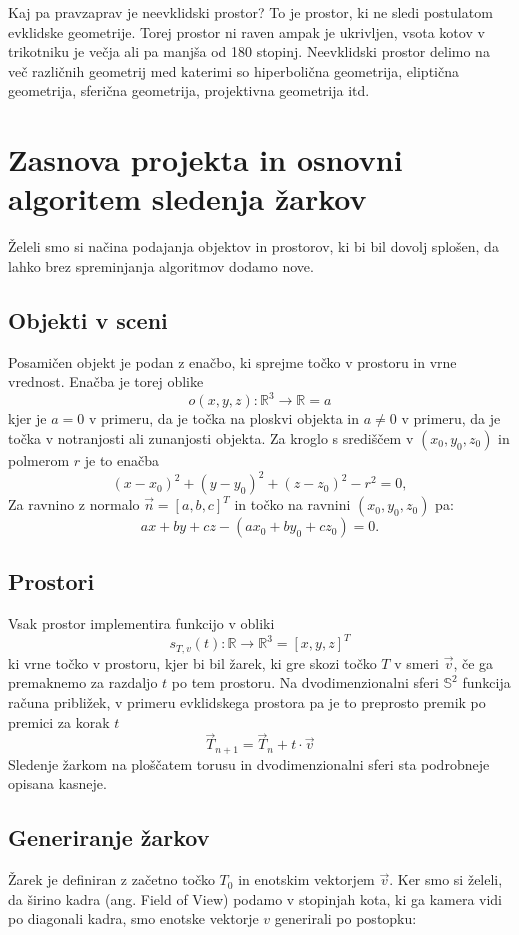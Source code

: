 \documentclass[titlepage]{article}
\begin{document}
Kaj pa pravzaprav je neevklidski prostor? To je prostor, ki ne sledi postulatom evklidske geometrije. 
Torej prostor ni raven ampak je ukrivljen, vsota kotov v trikotniku je večja ali pa manjša od 
180 stopinj. Neevklidski prostor delimo na več različnih geometrij med katerimi so 
hiperbolična geometrija, eliptična geometrija, sferična geometrija, projektivna geometrija itd.

\section{Zasnova projekta in osnovni algoritem sledenja žarkov}
Želeli smo si načina podajanja objektov in prostorov, ki bi bil dovolj splošen, da lahko brez
spreminjanja algoritmov dodamo nove.

\subsection{Objekti v sceni}
Posamičen objekt je podan z enačbo, ki sprejme točko v prostoru in vrne vrednost. 
Enačba je torej oblike
\[ o(x,y,z): \mathbb{R}^3 \to \mathbb{R} = a \]
kjer je \(a = 0\) v primeru, da je točka na ploskvi objekta in \( a \neq 0 \) v primeru, da 
je točka v notranjosti ali zunanjosti objekta.
Za kroglo s središčem v $(x_{0}, y_{0}, z_{0})$ in polmerom $r$ je to enačba
\[(x-x_{0})^{2}+(y-y_{0})^{2}+(z-z_{0})^{2}-r^{2}=0, \]
Za ravnino z normalo \( \vec{n} = [a, b, c]^T \) in točko na ravnini $(x_{0}, y_{0}, z_{0})$ pa:
\[ ax+by+cz-(ax_0+by_0+cz_0) = 0. \]

\subsection{Prostori}
Vsak prostor implementira funkcijo v obliki
\[ s_{T,v}(t): \mathbb{R} \to \mathbb{R}^3 = [x, y, z]^T \]
ki vrne točko v prostoru, kjer bi bil žarek, ki gre skozi točko \(T\) v smeri \(\vec{v}\), če 
ga premaknemo za razdaljo \(t\) po tem prostoru. Na dvodimenzionalni sferi $\mathbb{S}^{2}$ funkcija računa približek, v primeru evklidskega prostora pa je to preprosto premik po premici za korak \(t\)
\[ \vec{T}_{n+1} = \vec{T}_{n} + t \cdot \vec{v} \]
\bigskip
\newline
Sledenje žarkom na ploščatem torusu in dvodimenzionalni sferi sta podrobneje opisana kasneje.

\subsection{Generiranje žarkov}
Žarek je definiran z začetno točko \(T_{0}\) in enotskim vektorjem \(\vec{v}\). Ker smo si želeli, da 
širino kadra (ang. Field of View) podamo v stopinjah kota, ki ga kamera vidi po diagonali kadra,
smo enotske vektorje \( v \) generirali po postopku:
\end{document}
